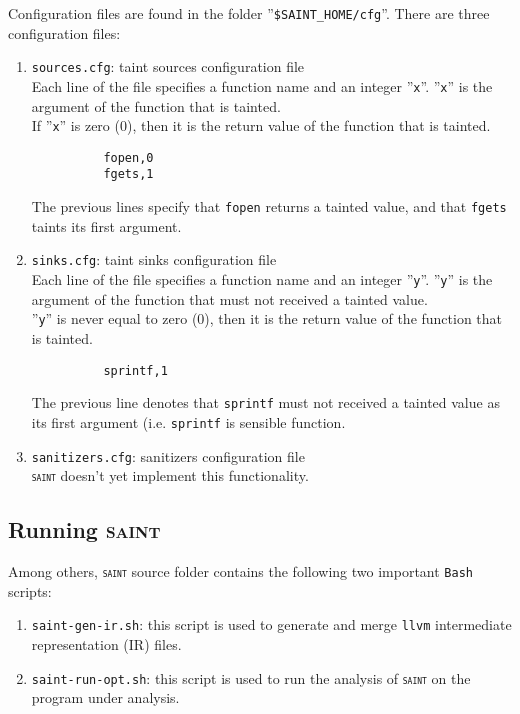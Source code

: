 \documentclass[12pt,onecolumn,a4paper]{article}
\newcommand{\saint}{\texttt{\textsc{saint}}\xspace}
\newcommand{\tool}[1]{\texttt{#1}\xspace}
\begin{document}
Configuration files are found in the folder ''\texttt{\$SAINT\_HOME/cfg}''.
There are three configuration files:
\begin{enumerate}[1)]
	\item \texttt{sources.cfg}: taint sources configuration file\\
		  Each line of the file specifies a function name and an integer ''\texttt{x}''.
		  ''\texttt{x}'' is the argument of the function that is tainted.\\
		  If ''\texttt{x}'' is zero (0), then it is the return value of the function that is tainted.
		  \begin{verbatim}
		  fopen,0
		  fgets,1		  
		  \end{verbatim}
		  The previous lines specify that \texttt{fopen} returns a tainted value, and
		  that \texttt{fgets} taints its first argument. 
	\item \texttt{sinks.cfg}: taint sinks configuration file\\
		  Each line of the file specifies a function name and an integer ''\texttt{y}''.
		  ''\texttt{y}'' is the argument of the function that must not received a tainted value.\\
		  ''\texttt{y}'' is never equal to zero (0), then it is the return
		  value of the function that is tainted.
		  \begin{verbatim}
		  sprintf,1	  
		  \end{verbatim}
		  The previous line denotes that \texttt{sprintf} must not received
		  a tainted value as its first argument (i.e. \texttt{sprintf} is 
		  sensible function.
	\item \texttt{sanitizers.cfg}: sanitizers configuration file\\
		  \saint doesn't yet implement this functionality.
\end{enumerate}

\subsection{Running \textsc{saint}}
Among others, \saint source folder contains the following two important
\texttt{Bash} scripts:
\begin{enumerate}[1)]
	\item \texttt{saint-gen-ir.sh}: this script is used to generate and
		merge \tool{llvm} intermediate representation (IR) files. 
	
	\item \texttt{saint-run-opt.sh}: this script is used to run the analysis of
		\saint on the program under analysis.
\end{enumerate}
\end{document}

